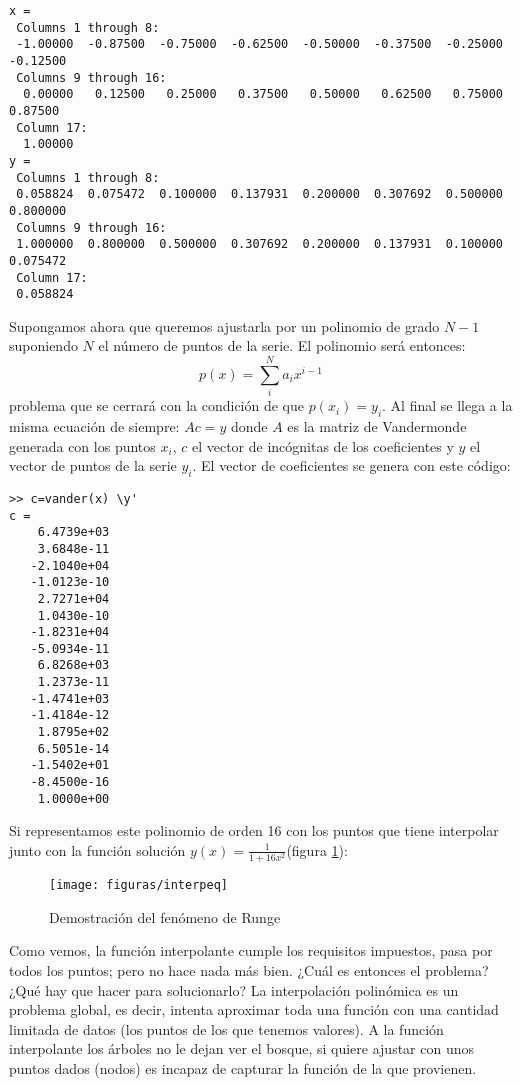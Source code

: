 \begin{verbatim}
x =
 Columns 1 through 8:
 -1.00000  -0.87500  -0.75000  -0.62500  -0.50000  -0.37500  -0.25000  -0.12500
 Columns 9 through 16:
  0.00000   0.12500   0.25000   0.37500   0.50000   0.62500   0.75000   0.87500
 Column 17:
  1.00000
y =
 Columns 1 through 8:
 0.058824  0.075472  0.100000  0.137931  0.200000  0.307692  0.500000  0.800000
 Columns 9 through 16:
 1.000000  0.800000  0.500000  0.307692  0.200000  0.137931  0.100000  0.075472
 Column 17:
 0.058824
\end{verbatim}
Supongamos ahora que queremos ajustarla por un polinomio de grado
$N-1$ suponiendo $N$ el número de puntos de la serie. El polinomio
será entonces:
$$ p(x)=\sum_{i}^{N}a_{i}x^{i-1}$$
problema que se cerrará con la condición de que $p(x_{i})=y_{i}$.  Al
final se llega a la misma ecuación de siempre: $Ac=y$ donde $A$ es
la matriz de Vandermonde generada con los puntos $x_{i}$, $c$ el
vector de incógnitas de los coeficientes y $y$ el vector de puntos de
la serie $y_{i}$. El vector de coeficientes se genera con este código:

\begin{verbatim}
>> c=vander(x) \y'
c =
    6.4739e+03
    3.6848e-11
   -2.1040e+04
   -1.0123e-10
    2.7271e+04
    1.0430e-10
   -1.8231e+04
   -5.0934e-11
    6.8268e+03
    1.2373e-11
   -1.4741e+03
   -1.4184e-12
    1.8795e+02
    6.5051e-14
   -1.5402e+01
   -8.4500e-16
    1.0000e+00
\end{verbatim}
Si representamos este polinomio de orden 16 con los puntos que tiene
interpolar junto con la función solución
$y(x)=\frac{1}{1+16x^{2}}$(figura \ref{cap:runge}):

%
\begin{figure}[h]
  \centering{}

  \texttt{[image: figuras/interpeq]}


  \caption{\label{cap:runge}Demostración del fenómeno de Runge}
\end{figure}


Como vemos, la función interpolante cumple los requisitos impuestos,
pasa por todos los puntos; pero no hace nada más bien. ¿Cuál es
entonces el problema? ¿Qué hay que hacer para solucionarlo? La
interpolación polinómica es un problema global, es decir, intenta
aproximar toda una función con una cantidad limitada de datos (los
puntos de los que tenemos valores). A la función interpolante los
árboles no le dejan ver el bosque, si quiere ajustar con unos puntos
dados (nodos) es incapaz de capturar la función de la que provienen.

